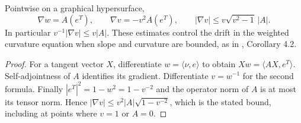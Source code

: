 \begin{lemma}\label{lem:graphical-slope-gradient}
Pointwise on a graphical hypersurface,
\[
 \nabla w=A(e^T),\qquad \nabla v=-v^2 A(e^T),\qquad
 |\nabla v|\leq v\sqrt{v^2-1}\,|A|.
\]
In particular $v^{-1}|\nabla v|\leq v|A|$. These estimates control the drift in the weighted curvature equation when slope and curvature are bounded, as in \cite{EH89}, Corollary 4.2.
\end{lemma}
\begin{proof}
For a tangent vector $X$, differentiate $w=\langle\nu,e\rangle$ to obtain $Xw=\langle AX,e^T\rangle$. Self-adjointness of $A$ identifies its gradient. Differentiate $v=w^{-1}$ for the second formula. Finally $|e^T|^2=1-w^2=1-v^{-2}$ and the operator norm of $A$ is at most its tensor norm. Hence $|\nabla v|\leq v^2|A|\sqrt{1-v^{-2}}$, which is the stated bound, including at points where $v=1$ or $A=0$.
\end{proof}

